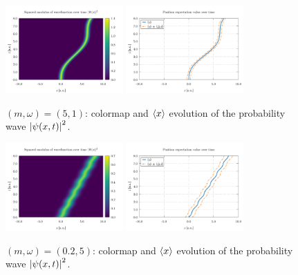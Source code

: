 \documentclass[pra, onecolumn, notitlepage, floats, 11pt]{revtex4-1}
\begin{document}
\begin{figure}[!h]
    \centering
    \includegraphics[width=0.40\textwidth]{images/cmap_5_M_1_O.pdf}
    \hspace{1cm}
    \includegraphics[width=0.40\textwidth]{images/expv_5_M_1_O.pdf}
    \caption{\( (m,\omega) = (5,1) \): colormap and \( \expval{x} \) evolution of the probability wave \( \abs{\psi(x,t)}^{2} \).}
    \label{fig:07_R_56}
\end{figure}
\begin{figure}[!h]
    \centering
    \includegraphics[width=0.40\textwidth]{images/cmap_0.2_M_5_O.pdf}
    \hspace{1cm}
    \includegraphics[width=0.40\textwidth]{images/expv_0.2_M_5_O.pdf}
    \caption{\( (m,\omega) = (0.2,5) \): colormap and \( \expval{x} \) evolution of the probability wave \( \abs{\psi(x,t)}^{2} \).}
    \label{fig:07_R_78}
\end{figure}
\end{document}
